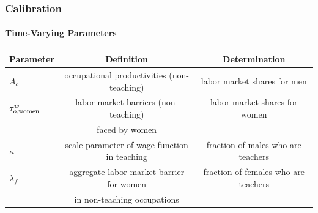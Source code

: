 \documentclass[11pt]{beamer}
\begin{document}
\begin{frame}
	\frametitle{Calibration}
	\framesubtitle{Time-Varying Parameters}
	\tiny
	\begin{table}[h!]
		\centering
		\begin{tabular}{lcc}
			\toprule
			Parameter & Definition & Determination \\
			\midrule			
			$A_{o}$ & occupational productivities (non-teaching) & labor market shares for men  \\
			$\tau^{w}_{o,{\rm women}}$ & labor market barriers (non-teaching) & labor market shares for women \\
			& faced by women & \\
			$\kappa$ & scale parameter of wage function in teaching & fraction of males who are teachers \\
			$\lambda_f$ & aggregate labor market barrier for women & fraction of females who are teachers \\
			& in non-teaching occupations & \\
			\bottomrule
		\end{tabular}
		\label{tab:param_time}
	\end{table}
\end{frame}

	



\end{document}
